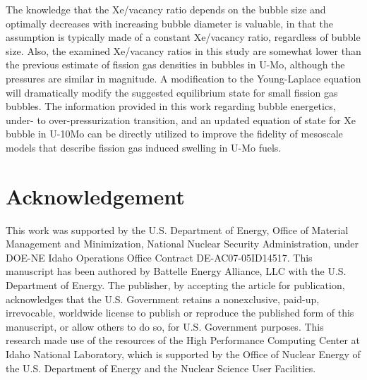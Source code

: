 \documentclass[review]{elsarticle}
\begin{document}
The knowledge that the Xe/vacancy ratio depends on the bubble size and optimally decreases with increasing bubble diameter is valuable, in that the assumption is typically made of a constant Xe/vacancy ratio, regardless of bubble size. Also, the examined Xe/vacancy ratios in this study are somewhat lower than the previous estimate of fission gas densities in bubbles in U-Mo, although the pressures are similar in magnitude. A modification to the Young-Laplace equation will dramatically modify the suggested equilibrium state for small fission gas bubbles. The information provided in this work regarding bubble energetics, under- to over-pressurization transition, and an updated equation of state for Xe bubble in U-10Mo can be directly utilized to improve the fidelity of mesoscale models that describe fission gas induced swelling in U-Mo fuels. 

\section{Acknowledgement}
This work was supported by the U.S. Department of Energy, Office of Material Management and Minimization, National Nuclear Security Administration, under DOE-NE Idaho Operations Office Contract DE-AC07-05ID14517. This manuscript has been authored by Battelle Energy Alliance, LLC with the U.S. Department of Energy. The publisher, by accepting the article for publication, acknowledges that the U.S. Government retains a nonexclusive, paid-up, irrevocable, worldwide license to publish or reproduce the published form of this manuscript, or allow others to do so, for U.S. Government purposes. This research made use of the resources of the High Performance Computing Center at Idaho National Laboratory, which is supported by the Office of Nuclear Energy of the U.S. Department of Energy and the Nuclear Science User Facilities.



\end{document}
